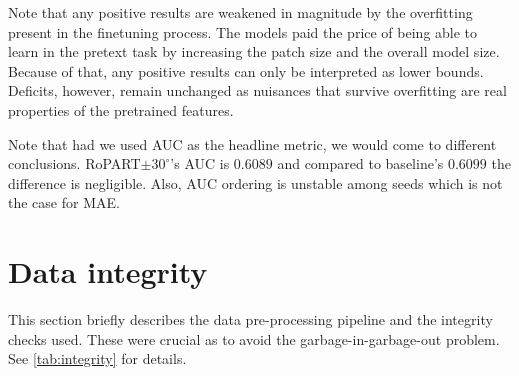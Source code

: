 \documentclass[final_report.tex]{subfiles}
\begin{document}
Note that any positive results are weakened in magnitude by the overfitting present in the finetuning process. The models paid the price of being able to learn \dphi{} in the pretext task by increasing the patch size and the overall model size. Because of that, any positive results can only be interpreted as lower bounds. Deficits, however, remain unchanged as nuisances that survive overfitting are real properties of the pretrained features.

Note that had we used AUC as the headline metric, we would come to different conclusions. RoPART$\pm30^\circ$'s AUC is $0.6089$  and compared to baseline's $0.6099$ the difference is negligible. Also, AUC ordering is unstable among seeds which is not the case for MAE.

\section{Data integrity}\label{sec:data-integrity}
This section briefly describes the data pre-processing pipeline and the integrity checks used. These were crucial as to avoid the garbage-in-garbage-out problem. See \cref{tab:integrity} for details.
\end{document}
